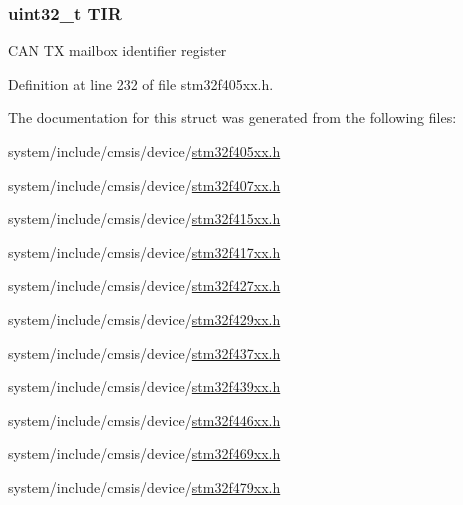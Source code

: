 \subsubsection[{\texorpdfstring{T\+IR}{TIR}}]{ uint32\+\_\+t T\+IR}\hypertarget{struct_c_a_n___tx_mail_box___type_def_a6921aa1c578a7d17c6e0eb33a73b6630}{}\label{struct_c_a_n___tx_mail_box___type_def_a6921aa1c578a7d17c6e0eb33a73b6630}
C\+AN TX mailbox identifier register 

Definition at line 232 of file stm32f405xx.\+h.



The documentation for this struct was generated from the following files\+:\begin{DoxyCompactItemize}
\item 
system/include/cmsis/device/\hyperlink{stm32f405xx_8h}{stm32f405xx.\+h}\item 
system/include/cmsis/device/\hyperlink{stm32f407xx_8h}{stm32f407xx.\+h}\item 
system/include/cmsis/device/\hyperlink{stm32f415xx_8h}{stm32f415xx.\+h}\item 
system/include/cmsis/device/\hyperlink{stm32f417xx_8h}{stm32f417xx.\+h}\item 
system/include/cmsis/device/\hyperlink{stm32f427xx_8h}{stm32f427xx.\+h}\item 
system/include/cmsis/device/\hyperlink{stm32f429xx_8h}{stm32f429xx.\+h}\item 
system/include/cmsis/device/\hyperlink{stm32f437xx_8h}{stm32f437xx.\+h}\item 
system/include/cmsis/device/\hyperlink{stm32f439xx_8h}{stm32f439xx.\+h}\item 
system/include/cmsis/device/\hyperlink{stm32f446xx_8h}{stm32f446xx.\+h}\item 
system/include/cmsis/device/\hyperlink{stm32f469xx_8h}{stm32f469xx.\+h}\item 
system/include/cmsis/device/\hyperlink{stm32f479xx_8h}{stm32f479xx.\+h}\end{DoxyCompactItemize}
